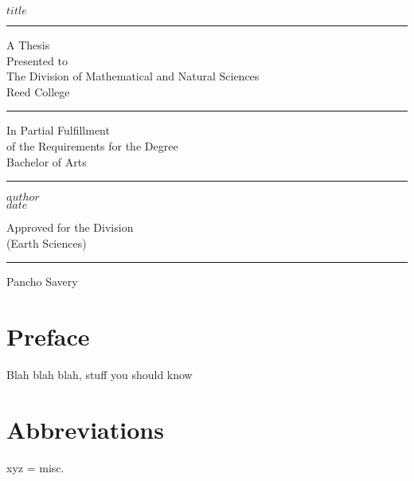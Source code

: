 %
%
%
%
%
%
%


\frontmatter
\begin{center}
    $title$
    \vfil
    \hrule
    \vfil
    A Thesis \\
    Presented to \\
    The Division of Mathematical and Natural Sciences \\
    Reed College
    \vfil
    \hrule
    \vfil
    In Partial Fulfillment \\
    of the Requirements for the Degree \\
    Bachelor of Arts
    \vfil
    \hrule
    \vfil
    $author$ \\
    $date$
    
    \cleardoublepage
    
    \vfil
    Approved for the Division \\
    (Earth Sciences)
    
    \bigskip
    \bigskip
    \bigskip
    \hrule
    
    \medskip
    Pancho Savery
    \vfil
\end{center}

\cleardoublepage

\chapter*{Preface}\label{preface}


Blah blah blah, stuff you should know

\cleardoublepage

\chapter*{Abbreviations}\label{abbreviations}


xyz = misc.
